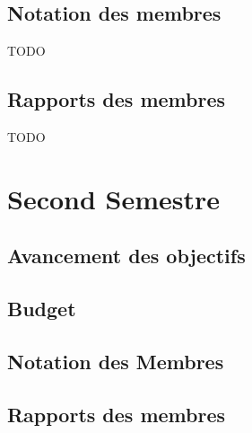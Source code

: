 \documentclass[12pt]{report}
\begin{document}
  \section{Notation des membres}
      TODO
  \section{Rapports des membres}
      TODO
  \chapter{Second Semestre}
  \section{Avancement des objectifs}
  \section{Budget}
  \section{Notation des Membres}
  \section{Rapports des membres}
\end{document}
